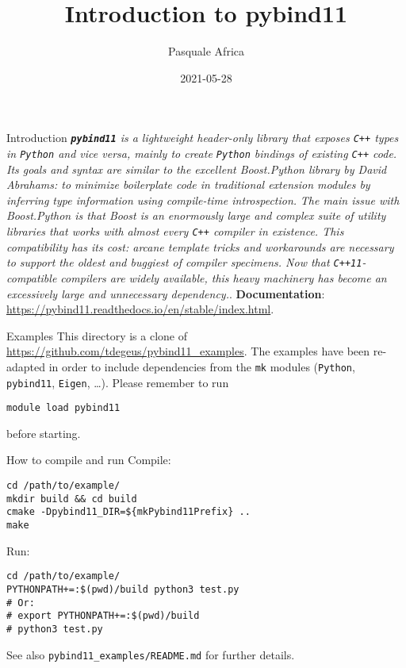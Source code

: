 \documentclass[aspectratio=169,11pt]{beamer}
\title{Introduction to pybind11}
\author{Pasquale Africa}
\institute{Politecnico di Milano}
\date{2021-05-28}
\begin{document}
\begin{frame}[plain]{}
    \maketitle
\end{frame}

\begin{frame}{Introduction}
    \textit{\textbf{\texttt{pybind11}} is a lightweight header-only library that exposes \texttt{C++} types in \texttt{Python} and vice versa, mainly to create \texttt{Python} bindings of existing \texttt{C++} code.}
    \vfill
    \textit{Its goals and syntax are similar to the excellent Boost.Python library by David Abrahams: to minimize boilerplate code in traditional extension modules by inferring type information using compile-time introspection.}
    \vfill
    \textit{The main issue with Boost.Python is that Boost is an enormously large and complex suite of utility libraries that works with almost every \texttt{C++} compiler in existence. This compatibility has its cost: arcane template tricks and workarounds are necessary to support the oldest and buggiest of compiler specimens. Now that \texttt{C++11}-compatible compilers are widely available, this heavy machinery has become an excessively large and unnecessary dependency.}.
    \vfill
    \textbf{Documentation}: \url{https://pybind11.readthedocs.io/en/stable/index.html}.
\end{frame}

\begin{frame}[fragile]{Examples}
    This directory is a clone of \url{https://github.com/tdegeus/pybind11_examples}.
    \vfill
    The examples have been re-adapted in order to include dependencies from the \texttt{mk} modules (\texttt{Python}, \texttt{pybind11}, \texttt{Eigen}, \dots).
    \vfill
    Please remember to run
    \begin{verbatim}
module load pybind11
    \end{verbatim}
    before starting.
\end{frame}

\begin{frame}[fragile]{How to compile and run}
    Compile:
    \begin{verbatim}
cd /path/to/example/
mkdir build && cd build
cmake -Dpybind11_DIR=${mkPybind11Prefix} ..
make
    \end{verbatim}
    Run:
    \begin{verbatim}
cd /path/to/example/
PYTHONPATH+=:$(pwd)/build python3 test.py
# Or:
# export PYTHONPATH+=:$(pwd)/build
# python3 test.py
    \end{verbatim}
    
    See also \texttt{pybind11\_examples/README.md} for further details.
\end{frame}
\end{document}
